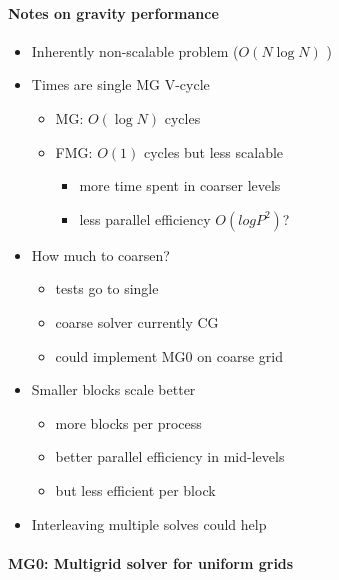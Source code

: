 \begin{frame}[fragile,label=ss-recent-gravity] 
\secframetitle{\ssRecentGravity}
\framesubtitle{Notes on gravity performance}
\begin{itemize}
\item Inherently non-scalable problem ($O(N \log N)$ )
\item Times are single MG V-cycle
\begin{itemize}
\item MG: $O(\log N)$ cycles
\item FMG: $O(1)$ cycles but less scalable
\begin{itemize}
\item more time spent in coarser levels
\item less parallel efficiency $O(log P^2)$?
\end{itemize}
\end{itemize}
\item  How much to coarsen?
\begin{itemize}
\item tests go to single 
\item coarse solver currently CG
\item could implement MG0 on coarse grid
\end{itemize}
\item Smaller blocks scale better
\begin{itemize}
\item  more blocks per process
\item better parallel efficiency in mid-levels
\item  but less efficient per block
\end{itemize}
\item Interleaving multiple solves could help
\end{itemize}
\end{frame}
%
\begin{frame}[fragile,label=ss-recent-gravity] 
\secframetitle{\ssRecentGravity}
\framesubtitle{MG0: Multigrid solver for uniform grids}
\end{frame}
% 
%
%
